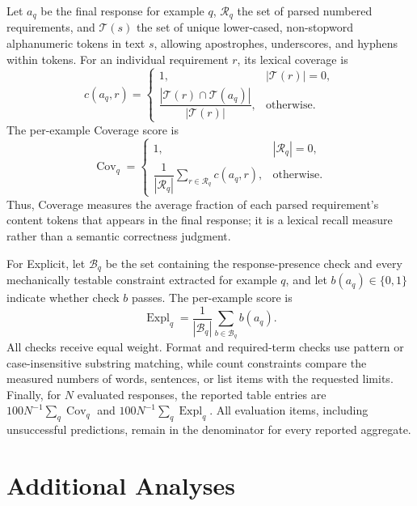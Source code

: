Let $a_q$ be the final response for example $q$, $\mathcal{R}_q$ the set of parsed numbered requirements, and $\mathcal{T}(s)$ the set of unique lower-cased, non-stopword alphanumeric tokens in text $s$, allowing apostrophes, underscores, and hyphens within tokens. For an individual requirement $r$, its lexical coverage is
\begin{equation}
 c(a_q,r)=
 \begin{cases}
 1, & |\mathcal{T}(r)|=0,\\
 \dfrac{|\mathcal{T}(r)\cap\mathcal{T}(a_q)|}{|\mathcal{T}(r)|}, & \text{otherwise}.
 \end{cases}
\end{equation}
The per-example Coverage score is
\begin{equation}
 \operatorname{Cov}_q=
 \begin{cases}
 1, & |\mathcal{R}_q|=0,\\
 \dfrac{1}{|\mathcal{R}_q|}\displaystyle\sum_{r\in\mathcal{R}_q}c(a_q,r), & \text{otherwise}.
 \end{cases}
\end{equation}
Thus, Coverage measures the average fraction of each parsed requirement's content tokens that appears in the final response; it is a lexical recall measure rather than a semantic correctness judgment.

For Explicit, let $\mathcal{B}_q$ be the set containing the response-presence check and every mechanically testable constraint extracted for example $q$, and let $b(a_q)\in\{0,1\}$ indicate whether check $b$ passes. The per-example score is
\begin{equation}
 \operatorname{Expl}_q=
 \frac{1}{|\mathcal{B}_q|}\sum_{b\in\mathcal{B}_q} b(a_q).
\end{equation}
All checks receive equal weight. Format and required-term checks use pattern or case-insensitive substring matching, while count constraints compare the measured numbers of words, sentences, or list items with the requested limits. Finally, for $N$ evaluated responses, the reported table entries are $100N^{-1}\sum_q\operatorname{Cov}_q$ and $100N^{-1}\sum_q\operatorname{Expl}_q$. All evaluation items, including unsuccessful predictions, remain in the denominator for every reported aggregate.

\FloatBarrier
\section{Additional Analyses}
\label{app:analysis}

